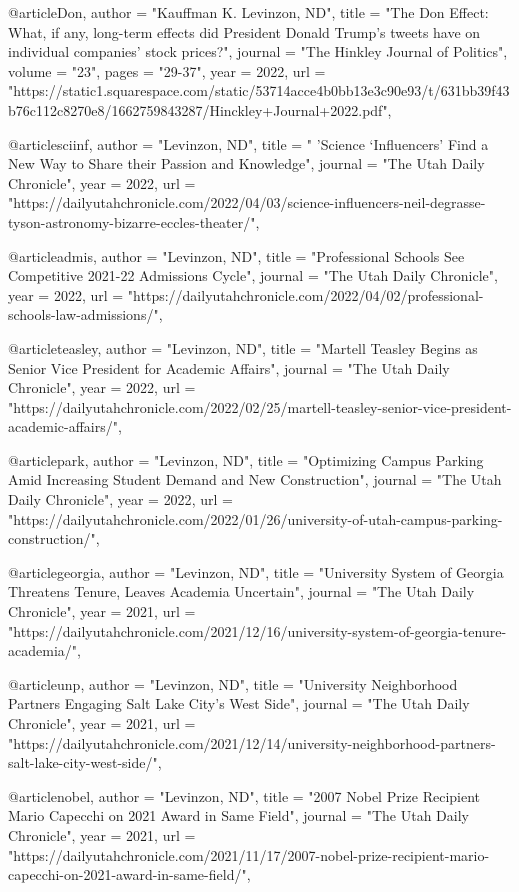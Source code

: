 @article{Don,
    author = "{Kauffman K. Levinzon, ND}",
    title = "The Don Effect: What, if any, long-term effects did President Donald Trump’s tweets have on individual companies’ stock prices?",
    journal = "The Hinkley Journal of Politics",
    volume = "23",
    pages = "29-37",
    year = {2022},
    url = "https://static1.squarespace.com/static/53714acce4b0bb13e3c90e93/t/631bb39f43b76c112c8270e8/1662759843287/Hinckley+Journal+2022.pdf",
}

@article{sciinf,
    author = "{Levinzon, ND}",
    title = " 'Science ‘Influencers’ Find a New Way to Share their Passion and Knowledge",
    journal = "The Utah Daily Chronicle",
    year = {2022},
    url = "https://dailyutahchronicle.com/2022/04/03/science-influencers-neil-degrasse-tyson-astronomy-bizarre-eccles-theater/",
}

@article{admis,
    author = "{Levinzon, ND}",
    title = "Professional Schools See Competitive 2021-22 Admissions Cycle",
    journal = "The Utah Daily Chronicle",
    year = {2022},
    url = "https://dailyutahchronicle.com/2022/04/02/professional-schools-law-admissions/",
}

@article{teasley,
    author = "{Levinzon, ND}",
    title = "Martell Teasley Begins as Senior Vice President for Academic Affairs",
    journal = "The Utah Daily Chronicle",
    year = {2022},
    url = "https://dailyutahchronicle.com/2022/02/25/martell-teasley-senior-vice-president-academic-affairs/",
}

@article{park,
    author = "{Levinzon, ND}",
    title = "Optimizing Campus Parking Amid Increasing Student Demand and New Construction",
    journal = "The Utah Daily Chronicle",
    year = {2022},
    url = "https://dailyutahchronicle.com/2022/01/26/university-of-utah-campus-parking-construction/",
}

@article{georgia,
    author = "{Levinzon, ND}",
    title = "University System of Georgia Threatens Tenure, Leaves Academia Uncertain",
    journal = "The Utah Daily Chronicle",
    year = {2021},
    url = "https://dailyutahchronicle.com/2021/12/16/university-system-of-georgia-tenure-academia/",
}

@article{unp,
    author = "{Levinzon, ND}",
    title = "University Neighborhood Partners Engaging Salt Lake City’s West Side",
    journal = "The Utah Daily Chronicle",
    year = {2021},
    url = "https://dailyutahchronicle.com/2021/12/14/university-neighborhood-partners-salt-lake-city-west-side/",
}

@article{nobel,
    author = "{Levinzon, ND}",
    title = "2007 Nobel Prize Recipient Mario Capecchi on 2021 Award in Same Field",
    journal = "The Utah Daily Chronicle",
    year = {2021},
    url = "https://dailyutahchronicle.com/2021/11/17/2007-nobel-prize-recipient-mario-capecchi-on-2021-award-in-same-field/",
}

